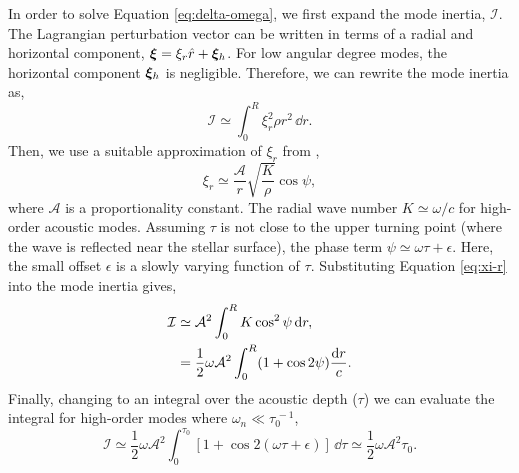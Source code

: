 \newcommand*{\propconst}{\ensuremath{{\mathcal{A}}}}

In order to solve Equation \ref{eq:delta-omega}, we first expand the mode inertia, \(\mathcal{I}\). The Lagrangian perturbation vector can be written in terms of a radial and horizontal component, \(\bm{\xi} = \xi_r \hat{r} + \bm{\xi}_h\). For low angular degree modes, the horizontal component \(\bm{\xi}_h\) is negligible. Therefore, we can rewrite the mode inertia as,
%
\begin{equation}
    \mathcal{I} \simeq \int_0^R \xi_r^2 \rho r^2 \, \dd r.
\end{equation}
%
Then, we use a suitable approximation of \(\xi_r\) from \citet{Gough1993}, 
%
\begin{equation}
    \xi_r \simeq \frac{\propconst}{r}\sqrt{\frac{K}{\rho}} \cos\psi,\label{eq:xi-r}
\end{equation}
%
where \(\propconst\) is a proportionality constant. The radial wave number \(K \simeq \omega / c\) for high-order acoustic modes. 
Assuming \(\tau\) is not close to the upper turning point (where the wave is reflected near the stellar surface), the phase term \(\psi \simeq \omega \tau + \epsilon\). Here, the small offset \(\epsilon\) is a slowly varying function of \(\tau\). Substituting Equation \ref{eq:xi-r} into the mode inertia gives,
%
\begin{align}
    \mathcal{I} &\simeq \propconst^2 \int_0^R K \cos^2\psi \, \dd r, \notag \\
    &= \frac12 \omega \propconst^2 \int_0^R (1 + \cos 2 \psi) \frac{\dd r}{c}.
\end{align}
%
Finally, changing to an integral over the acoustic depth (\(\tau\)) we can evaluate the integral for high-order modes where \(\omega_n \ll \tau_0^{\,-1}\),
%
\begin{equation}
    \mathcal{I} \simeq \frac12 \omega \propconst^2 \int_0^{\tau_0} [1 + \cos 2 (\omega\tau + \epsilon)] \, \dd \tau \simeq \frac12 \omega \propconst^2 \tau_0. \label{eq:inertia}
\end{equation}
%

